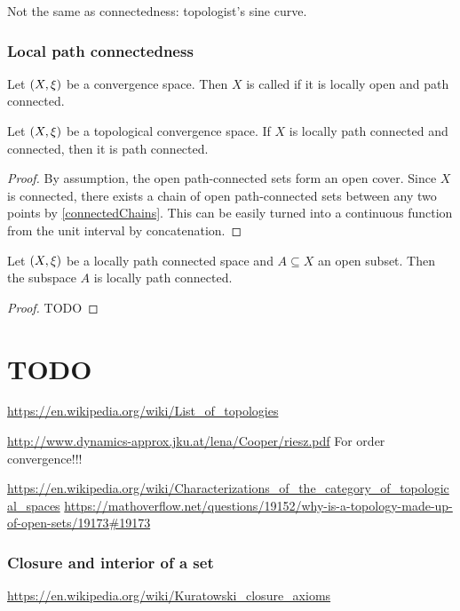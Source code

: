 \begin{example}
Not the same as connectedness: topologist's sine curve. 
\end{example}

\subsection{Local path connectedness}
\begin{definition}
Let $\sSet{X,\xi}$ be a convergence space. Then $X$ is called  if it is locally open and path connected.
\end{definition}

\begin{proposition}
Let $\sSet{X,\xi}$ be a topological convergence space. If $X$ is locally path connected and connected, then it is path connected.
\end{proposition}
\begin{proof}
By assumption, the open path-connected sets form an open cover. Since $X$ is connected, there exists a chain of open path-connected sets between any two points by \ref{connectedChains}. This can be easily turned into a continuous function from the unit interval by concatenation. 
\end{proof}

\begin{proposition}
Let $\sSet{X,\xi}$ be a locally path connected space and $A\subseteq X$ an open subset. Then the subspace $A$ is locally path connected.
\end{proposition}
\begin{proof}
TODO
\end{proof}


\chapter{TODO}

\url{https://en.wikipedia.org/wiki/List_of_topologies}

\url{http://www.dynamics-approx.jku.at/lena/Cooper/riesz.pdf} For order convergence!!!


\url{https://en.wikipedia.org/wiki/Characterizations_of_the_category_of_topological_spaces} 
\url{https://mathoverflow.net/questions/19152/why-is-a-topology-made-up-of-open-sets/19173#19173}




\subsection{Closure and interior of a set}
\url{https://en.wikipedia.org/wiki/Kuratowski_closure_axioms}

